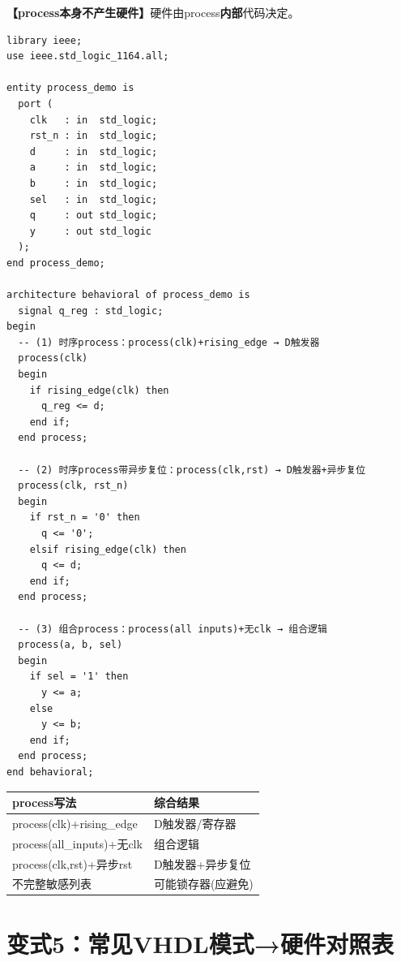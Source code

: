 \begin{detailbox}[完整教学]
\textbf{【process本身不产生硬件】}硬件由process\textbf{内部}代码决定。

\begin{lstlisting}[caption={三种典型process及其综合结果}]
library ieee;
use ieee.std_logic_1164.all;

entity process_demo is
  port (
    clk   : in  std_logic;
    rst_n : in  std_logic;
    d     : in  std_logic;
    a     : in  std_logic;
    b     : in  std_logic;
    sel   : in  std_logic;
    q     : out std_logic;
    y     : out std_logic
  );
end process_demo;

architecture behavioral of process_demo is
  signal q_reg : std_logic;
begin
  -- (1) 时序process：process(clk)+rising_edge → D触发器
  process(clk)
  begin
    if rising_edge(clk) then
      q_reg <= d;
    end if;
  end process;

  -- (2) 时序process带异步复位：process(clk,rst) → D触发器+异步复位
  process(clk, rst_n)
  begin
    if rst_n = '0' then
      q <= '0';
    elsif rising_edge(clk) then
      q <= d;
    end if;
  end process;

  -- (3) 组合process：process(all inputs)+无clk → 组合逻辑
  process(a, b, sel)
  begin
    if sel = '1' then
      y <= a;
    else
      y <= b;
    end if;
  end process;
end behavioral;
\end{lstlisting}

\begin{center}
\begin{tabular}{|l|l|}
\hline
\textbf{process写法} & \textbf{综合结果} \\
\hline
process(clk)+rising\_edge & D触发器/寄存器 \\
process(all\_inputs)+无clk & 组合逻辑 \\
process(clk,rst)+异步rst & D触发器+异步复位 \\
不完整敏感列表 & 可能锁存器(应避免) \\
\hline
\end{tabular}
\end{center}
\end{detailbox}


\section{变式5：常见VHDL模式→硬件对照表}

